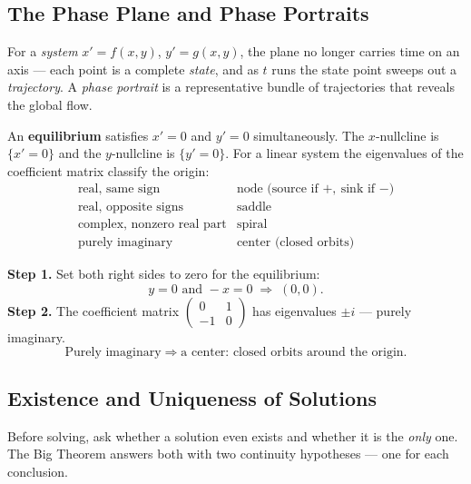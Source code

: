 \subsection{The Phase Plane and Phase Portraits}

For a \emph{system} $x' = f(x,y)$, $y' = g(x,y)$, the plane no longer carries
time on an axis --- each point is a complete \emph{state}, and as $t$ runs the
state point sweeps out a \emph{trajectory}. A \emph{phase portrait} is a
representative bundle of trajectories that reveals the global flow.

\begin{formulabox}
An \textbf{equilibrium} satisfies $x'=0$ and $y'=0$ simultaneously. The
$x$-nullcline is $\{x'=0\}$ and the $y$-nullcline is $\{y'=0\}$. For a linear
system the eigenvalues of the coefficient matrix classify the origin:
\[
\begin{array}{ll}
\text{real, same sign} & \text{node (source if } +,\ \text{sink if } -)\\
\text{real, opposite signs} & \text{saddle}\\
\text{complex, nonzero real part} & \text{spiral}\\
\text{purely imaginary} & \text{center (closed orbits)}
\end{array}
\]
\end{formulabox}

\begin{examplebox}[Worked Example 3.2: Classify $x'=y,\ y'=-x$]
\textbf{Step 1.} Set both right sides to zero for the equilibrium:
\[ y = 0 \text{ and } -x = 0 \;\Longrightarrow\; (0,0). \]
\textbf{Step 2.} The coefficient matrix
$\left(\begin{smallmatrix}0&1\\-1&0\end{smallmatrix}\right)$
has eigenvalues $\pm i$ --- purely imaginary.
\[ \text{Purely imaginary} \;\Longrightarrow\; \text{a center: closed orbits around the origin.} \]
\end{examplebox}

\subsection{Existence and Uniqueness of Solutions}

Before solving, ask whether a solution even exists and whether it is the
\emph{only} one. The Big Theorem answers both with two continuity hypotheses ---
one for each conclusion.

